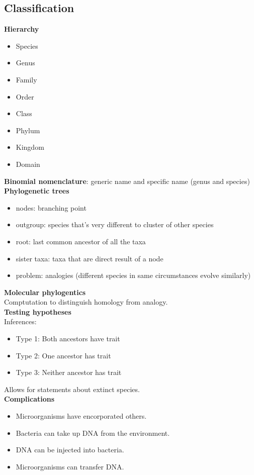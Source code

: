 \documentclass{article}
\theoremstyle{sltheorem}
\begin{document}
\subsection{Classification}
\textbf{Hierarchy}
\begin{itemize}
    \item Species
    \item Genus
    \item Family
    \item Order
    \item Class
    \item Phylum
    \item Kingdom
    \item Domain
\end{itemize}
\textbf{Binomial nomenclature}: generic name and specific name (genus and species)\\
\textbf{Phylogenetic trees}
\begin{itemize}
    \item nodes: branching point
    \item outgroup: species that's very different to cluster of other species
    \item root: last common ancestor of all the taxa
    \item sister taxa: taxa that are direct result of a node
    \item problem: analogies (different species in same circumstances evolve similarly)
\end{itemize}
\textbf{Molecular phylogentics}\\
Comptutation to distinguish homology from analogy.\\
\textbf{Testing hypotheses}\\
Inferences:
\begin{itemize}
    \item Type 1: Both ancestors have trait
    \item Type 2: One ancestor has trait
    \item Type 3: Neither ancestor has trait
\end{itemize}
Allows for statements about extinct species.\\
\textbf{Complications}
\begin{itemize}
    \item Microorganisms have encorporated others.
    \item Bacteria can take up DNA from the environment.
    \item DNA can be injected into bacteria.
    \item Microorganisms can transfer DNA.
\end{itemize}
\end{document}
